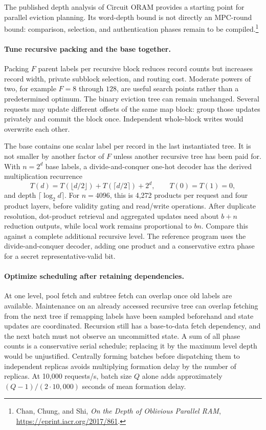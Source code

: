 The published depth analysis of Circuit ORAM provides a starting point for
parallel eviction planning. Its word-depth bound is not directly an MPC-round
bound: comparison, selection, and authentication phases remain to be
compiled.\footnote{Chan, Chung, and Shi, \emph{On the Depth of Oblivious
Parallel RAM}, \url{https://eprint.iacr.org/2017/861}.}

\paragraph{Tune recursive packing and the base together.}
Packing $F$ parent labels per recursive block reduces record counts but
increases record width, private subblock selection, and routing cost.
Moderate powers of two, for example $F=8$ through $128$, are useful search
points rather than a predetermined optimum. The binary eviction tree can
remain unchanged. Several requests may update different offsets of the same
map block: group those updates privately and commit the block once.
Independent whole-block writes would overwrite each other.

The base contains one scalar label per record in the last instantiated tree.
It is not smaller by another factor of $F$ unless another recursive tree has
been paid for. With $n=2^d$ base labels, a divide-and-conquer one-hot decoder
has the derived multiplication recurrence
\[
 T(d)=T(\lfloor d/2\rfloor)+T(\lceil d/2\rceil)+2^d,
 \qquad T(0)=T(1)=0,
\]
and depth $\lceil\log_2 d\rceil$. For $n=4096$, this is 4,272 products per
request and four product layers, before validity gating and read/write
operations. After duplicate resolution, dot-product retrieval and aggregated
updates need about $b+n$ reduction outputs, while local work remains
proportional to $bn$. Compare this against a complete additional recursive
level. The reference program uses the divide-and-conquer decoder, adding one
product and a conservative extra phase for a secret representative-valid bit.

\paragraph{Optimize scheduling after retaining dependencies.}
At one level, pool fetch and subtree fetch can overlap once old labels are
available. Maintenance on an already accessed recursive tree can overlap
fetching from the next tree if remapping labels have been sampled beforehand
and state updates are coordinated. Recursion still has a base-to-data fetch
dependency, and the next batch must not observe an uncommitted state. A sum
of all phase counts is a conservative serial schedule; replacing it by the
maximum level depth would be unjustified. Centrally forming batches before
dispatching them to independent replicas avoids multiplying formation delay
by the number of replicas. At 10,000 requests/s, batch size $Q$ alone adds
approximately $(Q-1)/(2\cdot10{,}000)$ seconds of mean formation delay.

